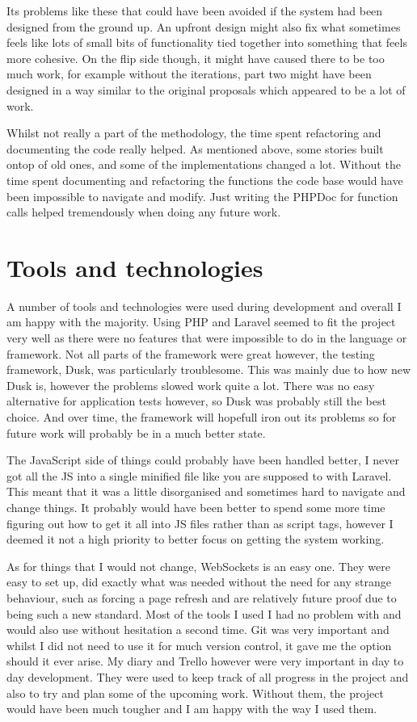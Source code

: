 Its problems like these that could have been avoided if the system had been designed from the ground up. An upfront design might also fix what sometimes feels like lots of small bits of functionality tied together into something that feels more cohesive. On the flip side though, it might have caused there to be too much work, for example without the iterations, part two might have been designed in a way similar to the original proposals which appeared to be a lot of work.

Whilst not really a part of the methodology, the time spent refactoring and documenting the code really helped. As mentioned above, some stories built ontop of old ones, and some of the implementations changed a lot. Without the time spent documenting and refactoring the functions the code base would have been impossible to navigate and modify. Just writing the PHPDoc for function calls helped tremendously when doing any future work.

\section{Tools and technologies}
A number of tools and technologies were used during development and overall I am happy with the majority. Using PHP and Laravel seemed to fit the project very well as there were no features that were impossible to do in the language or framework. Not all parts of the framework were great however, the testing framework, Dusk, was particularly troublesome. This was mainly due to how new Dusk is, however the problems slowed work quite a lot. There was no easy alternative for application tests however, so Dusk was probably still the best choice. And over time, the framework will hopefull iron out its problems so for future work will probably be in a much better state. 

The JavaScript side of things could probably have been handled better, I never got all the JS into a single minified file like you are supposed to with Laravel. This meant that it was a little disorganised and sometimes hard to navigate and change things. It probably would have been better to spend some more time figuring out how to get it all into JS files rather than as script tags, however I deemed it not a high priority to better focus on getting the system working.

As for things that I would not change, WebSockets is an easy one. They were easy to set up, did exactly what was needed without the need for any strange behaviour, such as forcing a page refresh and are relatively future proof due to being such a new standard. Most of the tools I used I had no problem with and would also use without hesitation a second time. Git was very important and whilst I did not need to use it for much version control, it gave me the option should it ever arise. My diary and Trello however were very important in day to day development. They were used to keep track of all progress in the project and also to try and plan some of the upcoming work. Without them, the project would have been much tougher and I am happy with the way I used them.

